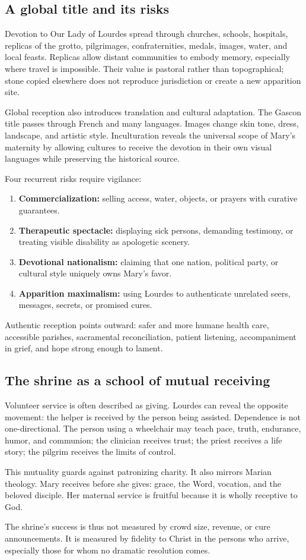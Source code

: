 \subsection{A global title and its risks}

Devotion to Our Lady of Lourdes spread through churches, schools, hospitals, replicas of the grotto, pilgrimages, confraternities, medals, images, water, and local feasts. Replicas allow distant communities to embody memory, especially where travel is impossible. Their value is pastoral rather than topographical; stone copied elsewhere does not reproduce jurisdiction or create a new apparition site.

Global reception also introduces translation and cultural adaptation. The Gascon title passes through French and many languages. Images change skin tone, dress, landscape, and artistic style. Inculturation reveals the universal scope of Mary's maternity by allowing cultures to receive the devotion in their own visual languages while preserving the historical source.

Four recurrent risks require vigilance:

\begin{enumerate}
  \item \textbf{Commercialization:} selling access, water, objects, or prayers with curative guarantees.
  \item \textbf{Therapeutic spectacle:} displaying sick persons, demanding testimony, or treating visible disability as apologetic scenery.
  \item \textbf{Devotional nationalism:} claiming that one nation, political party, or cultural style uniquely owns Mary's favor.
  \item \textbf{Apparition maximalism:} using Lourdes to authenticate unrelated seers, messages, secrets, or promised cures.
\end{enumerate}

Authentic reception points outward: safer and more humane health care, accessible parishes, sacramental reconciliation, patient listening, accompaniment in grief, and hope strong enough to lament.

\subsection{The shrine as a school of mutual receiving}

Volunteer service is often described as giving. Lourdes can reveal the opposite movement: the helper is received by the person being assisted. Dependence is not one-directional. The person using a wheelchair may teach pace, truth, endurance, humor, and communion; the clinician receives trust; the priest receives a life story; the pilgrim receives the limits of control.

This mutuality guards against patronizing charity. It also mirrors Marian theology. Mary receives before she gives: grace, the Word, vocation, and the beloved disciple. Her maternal service is fruitful because it is wholly receptive to God.

The shrine's success is thus not measured by crowd size, revenue, or cure announcements. It is measured by fidelity to Christ in the persons who arrive, especially those for whom no dramatic resolution comes.
